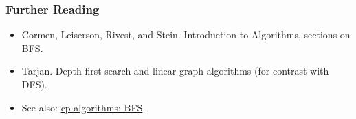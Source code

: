 \documentclass{beamer}
\begin{document}
\begin{frame}
\frametitle{Further Reading}
\begin{itemize}
    \item Cormen, Leiserson, Rivest, and Stein. Introduction to Algorithms, sections on BFS.
    \item Tarjan. Depth-first search and linear graph algorithms (for contrast with DFS).
    \item See also: \href{https://cp-algorithms.com/graph/breadth-first-search.html}{cp-algorithms: BFS}.
\end{itemize}
\end{frame}
\end{document}

